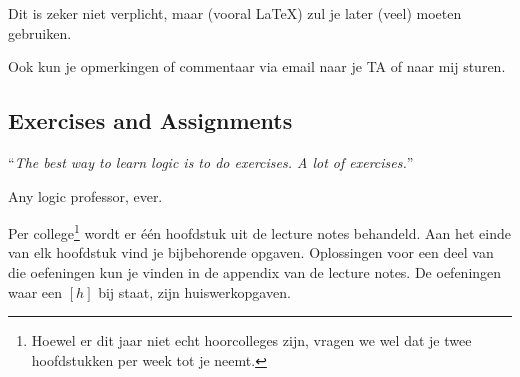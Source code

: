 \documentclass[a4paper,11pt]{article}
\begin{document}
Dit is zeker niet verplicht, maar (vooral \LaTeX) zul je later (veel) moeten gebruiken.

Ook kun je opmerkingen of commentaar via email naar je TA of naar mij sturen.





\subsection*{Exercises and Assignments}

``{\it The best way to learn logic is to do exercises. A lot of exercises.}''
\begin{flushright}
Any logic professor, ever.
\end{flushright}

Per college\footnote{Hoewel er dit jaar niet echt hoorcolleges zijn, vragen we wel dat je twee hoofdstukken per week tot je neemt.} wordt er één hoofdstuk uit de lecture notes behandeld. Aan het einde van elk hoofdstuk vind je bijbehorende opgaven. Oplossingen voor een deel van die oefeningen kun je vinden in de appendix van de lecture notes. De oefeningen waar een $[h]$ bij staat, zijn huiswerkopgaven.
\end{document}
